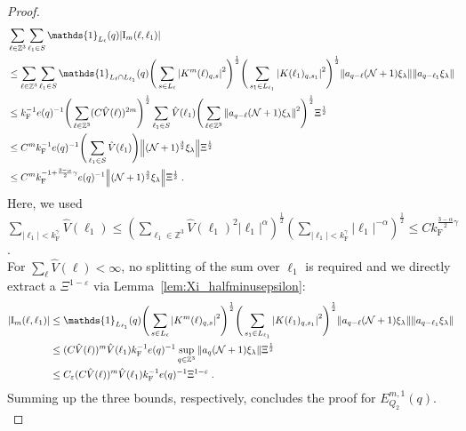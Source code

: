 \documentclass[12pt,a4paper]{article}
\numberwithin{equation}{section}
\newcommand{\1}{\mathbb{I}}
\newcommand{\F}{\mathrm{F}}
\newcommand{\I}{\mathrm{I}}
\newcommand{\Zstar}{\mathbb{Z}^3} %
\newcommand{\Z}{\mathbb{Z}}
\newcommand{\NN}{\mathcal{N}}
\newcommand{\half}{\frac{1}{2}}
\theoremstyle{plain}
\theoremstyle{definition}
\theoremstyle{remark}
\theoremstyle{plain}
\theoremstyle{definition}
\theoremstyle{remark}
\begin{document}
\begin{proof}
\begin{align}
	&\sum_{\ell \in \Zstar} \sum_{\ell_1 \in S} \mathds{1}_{L_\ell}(q) |\I_m(\ell, \ell_1)| \nonumber\\
	&\leq \sum_{\ell \in \Zstar} \sum_{\ell_1 \in S} \mathds{1}_{L_\ell \cap L_{\ell_1}}(q) \Bigg(\sum\limits_{s \in L_{\ell}} \abs{K^m(\ell)_{q,s}}^2\Bigg)^\half
		\Bigg(\sum\limits_{s_1 \in L_{\ell_1}} \abs{K(\ell_1)_{q,s_1}}^2\Bigg)^\half
		\norm{ a_{q-\ell} (\NN+1) \xi_\lambda}
		\norm{ a_{q-\ell_1} \xi_\lambda }\nonumber\\
	&\leq k_{\F}^{-1} e(q)^{-1}
		\Bigg( \sum_{\ell \in \Zstar} (C \hat{V}(\ell))^{2m} \Bigg)^{\half}
		\sum_{\ell_1 \in S} \hat{V}(\ell_1)
		\Bigg( \sum_{\ell \in \Z^3} \norm{ a_{q-\ell} (\NN+1) \xi_\lambda}^2 \Bigg)^{\half}
		\Xi^{\half} \nonumber\\
	&\leq C^m k_{\F}^{-1} e(q)^{-1}
		\Bigg( \sum_{\ell_1 \in S} \hat{V}(\ell_1) \Bigg) \norm{(\NN+1)^{\frac 32} \xi_\lambda} \Xi^{\half} \nonumber\\
	&\leq C^m k_{\F}^{-1 + \frac{3-\alpha}{2} \gamma} e(q)^{-1}
		\norm{(\NN+1)^{\frac 32} \xi_\lambda} \Xi^{\half} \;. \label{eq:estEQ2113_Coulomb_2}
\end{align}
Here, we used $ \sum_{|\ell_1| < k_{\F}^\gamma} \hat{V}(\ell_1) \le \left( \sum_{\ell_1 \in \Zstar} \hat{V}(\ell_1)^2 |\ell_1|^\alpha \right)^{\half} \left( \sum_{|\ell_1| < k_{\F}^\gamma} |\ell_1|^{-\alpha} \right)^{\half} \le C k_{\F}^{\frac{3-\alpha}{2} \gamma} $.\\
For $ \sum_\ell \hat{V}(\ell) < \infty $, no splitting of the sum over $ \ell_1 $ is required and we directly extract a $ \Xi^{1-\varepsilon} $ via Lemma~\ref{lem:Xi_halfminusepsilon}:
\begin{align}
	|\I_m(\ell, \ell_1)|
	&\leq \mathds{1}_{L_{\ell_1}}(q) \Bigg(\sum_{s \in L_{\ell}} \abs{K^m(\ell)_{q,s}}^2\Bigg)^\half
		\Bigg(\sum_{s_1 \in L_{\ell_1}} \abs{K(\ell_1)_{q,s_1}}^2\Bigg)^\half
		\norm{ a_{q-\ell} (\NN+1) \xi_\lambda}
		\norm{ a_{q-\ell_1} \xi_\lambda }\nonumber\\
	&\leq (C \hat{V}(\ell))^m \hat{V}(\ell_1) k_{\F}^{-1} e(q)^{-1}
		\sup_{q \in \Z^3} \norm{ a_q (\NN+1) \xi_\lambda }\Xi^{\half} \nonumber\\
	&\leq C_\varepsilon (C \hat{V}(\ell))^m
		\hat{V}(\ell_1)
		k_{\F}^{-1} e(q)^{-1} \Xi^{1-\varepsilon} \;. \label{eq:estEQ2113}
\end{align}
Summing up the three bounds, respectively, concludes the proof for $ E^{m,1}_{Q_2}(q) $.\\


\end{proof}
\end{document}
